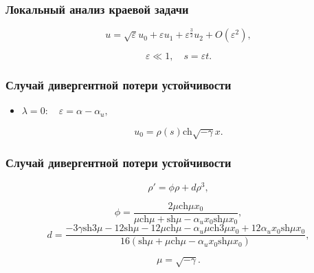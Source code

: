 \documentclass[fullscreen=true, unicode, bookmarks=false]{beamer}
\begin{document}
\begin{frame}
\frametitle{ Локальный анализ краевой задачи }

\begin{equation}
	u = \sqrt{\varepsilon}u_0 + \varepsilon u_1 + \varepsilon^{\frac{3}{2}} u_2 + O(\varepsilon^2),
\end{equation}

\bigskip

$$ \varepsilon \ll 1, \quad s = \varepsilon t. $$

\end{frame}

\begin{frame}
\frametitle{ Случай дивергентной потери устойчивости }

\begin{itemize}
\item { $ \lambda = 0: \quad \varepsilon=\alpha-\alpha_u, $
}
\end{itemize}

\bigskip

\begin{equation}
	u_0 = \rho(s) \mbox{ch} \sqrt{-\gamma} x.
\end{equation}

\end{frame}

\begin{frame}
\frametitle{ Случай дивергентной потери устойчивости }

\begin{equation}
	\rho' = \phi \rho + d \rho^3,
\end{equation}

\bigskip
\pause

$$ \phi = \frac{ 2 \mu \mbox{ch} \mu x_0 }{ \mu \mbox{ch} \mu +\mbox{sh} \mu - \alpha_u x_0 \mbox{sh} \mu x_0 }, $$
$$ d = \frac{ -3\gamma \mbox{sh} 3\mu - 12 \mbox{sh} \mu - 12 \mu \mbox{ch} \mu - \alpha_u \mu \mbox{ch} 3\mu x_0 + 12 \alpha_u x_0 \mbox{sh} \mu x_0 }{ 16( \mbox{sh} \mu + \mu \mbox{ch} \mu - \alpha_u x_0 \mbox{sh} \mu x_0 ) }, $$

$$ \mu = \sqrt{-\gamma}. $$

\end{frame}
\end{document}
